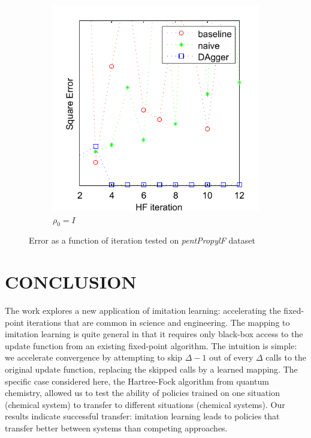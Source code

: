 \documentclass[twoside,11pt]{article}
\begin{document}
\begin{figure}[h!]
\begin{subfigure}{.5\textwidth}
  \includegraphics[scale=0.7]{propylsub_peye_test_12iter_naive.pdf}
  \caption{$\rho_0 = I$}
  \label{fig:propSubI}
\end{subfigure}
\caption{Error as a function of iteration tested on \textit{pentPropylF} dataset}
\label{fig:testpropSub}
\end{figure}


\section{CONCLUSION}

The work explores a new application of imitation learning: accelerating the fixed-point iterations that are common in science and engineering. The mapping to imitation learning is quite general in that it requires only black-box access to the update function from an existing fixed-point algorithm. The intuition is simple: we accelerate convergence by attempting to skip $\Delta-1$ out of every $\Delta$ calls to the original update function, replacing the skipped calls by a learned mapping.
The specific case considered here, the Hartree-Fock algorithm from quantum chemistry, allowed us to test the ability of policies trained on one situation (chemical system) to transfer to different situations (chemical systems). Our results  indicate successful transfer: imitation learning leads to policies that transfer better between systems than competing approaches.
\end{document}
